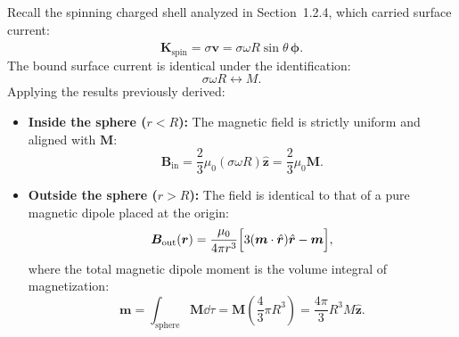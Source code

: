 \begin{example}
    Recall the spinning charged shell analyzed in Section~1.2.4, which carried surface current:
    \begin{equation}
        \bm{K}_{\text{spin}} = \sigma \bm{v} = \sigma \omega R \sin\theta\,\hat{\bm{\phi}}.
    \end{equation}
    The bound surface current is identical under the identification:
    \begin{equation}
        \sigma \omega R \longleftrightarrow M.
    \end{equation}
    Applying the results previously derived:
    \begin{itemize}
        \item \textbf{Inside the sphere ($r < R$):} The magnetic field is strictly uniform and aligned with $\bm{M}$:
        \begin{equation}
            \bm{B}_{\text{in}} = \frac{2}{3}\mu_0 (\sigma \omega R)\hat{\bm{z}} = \frac{2}{3}\mu_0 \bm{M}.
        \end{equation}
        \item \textbf{Outside the sphere ($r > R$):} The field is identical to that of a pure magnetic dipole placed at the origin:
        \begin{equation}
            \bm{B}_{\text{out}}(\bm{r}) = \frac{\mu_0}{4\pi r^3} \Big[ 3(\bm{m}\cdot \hat{\bm{r}})\hat{\bm{r}} - \bm{m} \Big],
        \end{equation}
        where the total magnetic dipole moment is the volume integral of magnetization:
        \begin{equation}
            \bm{m} = \int_{\text{sphere}} \bm{M}\dd{\tau} = \bm{M} \left( \frac{4}{3}\pi R^3 \right) = \frac{4\pi}{3} R^3 M \hat{\bm{z}}.
        \end{equation}
    \end{itemize}
\end{example}

